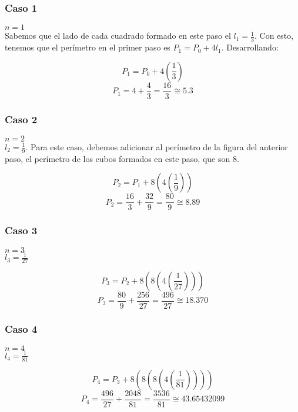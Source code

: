 \documentclass[12pt]{article}
\begin{document}
\subsubsection{Caso 1}
$n=1$\\
Sabemos que el lado de cada cuadrado formado en este paso el $l_1=\frac{1}{3}$. Con esto, tenemos que el perímetro en el primer paso es $P_1=P_0+4l_1$. Desarrollando:

\begin{equation*}
    P_1=P_0+4\left(\frac{1}{3}\right)
\end{equation*}
\begin{equation*}
    P_1=4+\frac{4}{3}=\frac{16}{3}\cong5.3
\end{equation*}

\subsubsection{Caso 2}
$n=2$\\
$l_2=\frac{1}{9}$. Para este caso, debemos adicionar al perímetro de la figura del anterior paso, el perímetro de los cubos formados en este paso, que son 8.

\begin{equation*}
    P_2=P_1+8\left(4\left(\frac{1}{9}\right)\right)
\end{equation*}
\begin{equation*}
    P_2=\frac{16}{3}+\frac{32}{9}=\frac{80}{9}\cong8.89
\end{equation*}

\subsubsection{Caso 3}
$n=3$\\
$l_3=\frac{1}{27}$

\begin{equation*}
    P_3=P_2+8\left(8\left(4\left(\frac{1}{27}\right)\right)\right)
\end{equation*}
\begin{equation*}
    P_3=\frac{80}{9}+\frac{256}{27}=\frac{496}{27}\cong18.370
\end{equation*}

\subsubsection{Caso 4}
$n=4$\\
$l_4=\frac{1}{81}$

\begin{equation*}
    P_4=P_3+8\left(8\left(8\left(4\left(\frac{1}{81}\right)\right)\right)\right)
\end{equation*}
\begin{equation*}
    P_4=\frac{496}{27}+\frac{2048}{81}=\frac{3536}{81}\cong43.65432099
\end{equation*}
\end{document}
